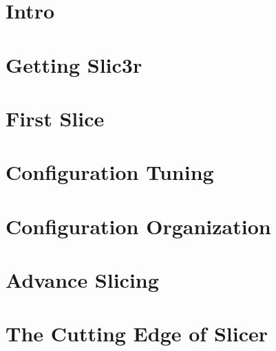 \section{Intro}


\section{Getting Slic3r}


\section{First Slice}


\section{Configuration Tuning}


\section{Configuration Organization}


\section{Advance Slicing}


%

\section{The Cutting Edge of Slicer}

